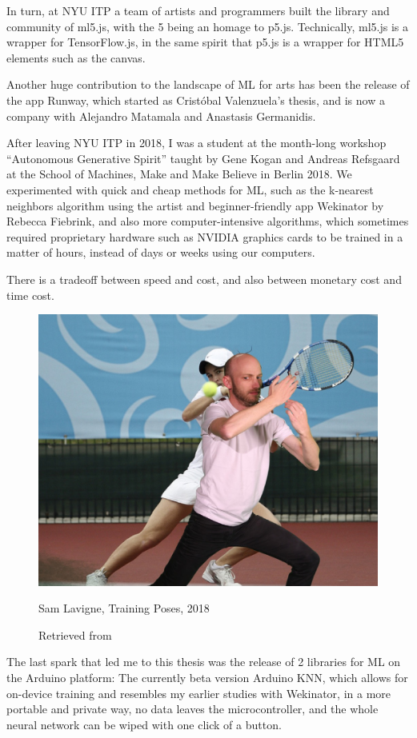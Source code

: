 In turn, at \acrshort{NYU} \acrshort{ITP} a team of artists and programmers built the library and community of ml5.js, with the 5 being an homage to p5.js. Technically, ml5.js is a wrapper for TensorFlow.js, in the same spirit that p5.js is a wrapper for HTML5 elements such as the canvas.

Another huge contribution to the landscape of \acrshort{ML} for arts has been the release of the app Runway, which started as Cristóbal Valenzuela’s thesis, and is now a company with Alejandro Matamala and Anastasis Germanidis.

After leaving \acrshort{NYU} \acrshort{ITP} in 2018, I was a student at the month-long workshop “Autonomous Generative Spirit” taught by Gene Kogan and Andreas Refsgaard at the School of Machines, Make and Make Believe in Berlin 2018. We experimented with quick and cheap methods for \acrshort{ML}, such as the k-nearest neighbors algorithm using the artist and beginner-friendly app Wekinator by Rebecca Fiebrink, and also more computer-intensive algorithms, which sometimes required proprietary hardware such as NVIDIA graphics cards to be trained in a matter of hours, instead of days or weeks using our computers.

There is a tradeoff between speed and cost, and also between monetary cost and time cost.

\begin{figure}[ht]
  \centering
    \includegraphics[width=0.75\linewidth,height=0.25\textheight,keepaspectratio]{images/sam-lavigne-training-poses.jpg}
  \caption{Sam Lavigne, Training Poses, 2018}
  \caption*{Retrieved from \cite{website-sam-lavigne-training-poses}}
  \label{fig:sam-lavigne-training-poses}
\end{figure}

The last spark that led me to this thesis was the release of 2 libraries for \acrshort{ML} on the Arduino platform: The currently beta version Arduino KNN, which allows for on-device training and resembles my earlier studies with Wekinator, in a more portable and private way, no data leaves the microcontroller, and the whole neural network can be wiped with one click of a button.

